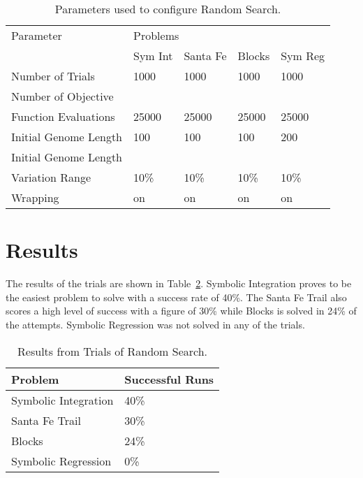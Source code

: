 \begin{table}[h]
\begin{center}
\begin{tabular}{|l|l|l|l|l|}
\hline
Parameter &\multicolumn{4}{l|}{Problems}\\
\cline{2-1} \cline{3-1} \cline{4-1} \cline{5-1} 
 & Sym Int & Santa Fe & Blocks & Sym Reg  \\
\hline
Number of Trials & 1000 & 1000 & 1000 & 1000 \\
Number of Objective & & & & \\ 
Function Evaluations  & 25000 & 25000 & 25000 & 25000  \\
Initial Genome Length & 100 & 100 & 100 & 200  \\
Initial Genome Length & & & &  \\
Variation Range  & 10\% & 10\% & 10\% & 10\%  \\
Wrapping         & on   & on   & on   & on    \\
\hline
\end{tabular}
\caption{\label{rs_param_table} Parameters used to configure Random Search.}
\end{center}
\end{table}


 

\section{Results}

The results of the trials are shown in Table~\ref{rs_results_table}. Symbolic Integration proves to be the easiest problem to solve with a success rate of 40\%. The Santa Fe Trail also scores a high level of success with a figure of 30\% while Blocks is solved in 24\% of the attempts. Symbolic Regression was not solved in any of the trials.
\begin{table}[h]
\begin{center}
\begin{tabular}{|l|l|}
\hline
Problem & Successful Runs \\
\hline
Symbolic Integration & 40\% \\
Santa Fe Trail & 30\% \\
Blocks & 24\% \\
Symbolic Regression & 0\% \\
\hline
\end{tabular}
\caption{\label{rs_results_table} Results from Trials of Random Search.}
\end{center}
\end{table}

